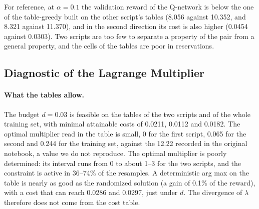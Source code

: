 For reference, at $\alpha=0.1$ the validation reward of the Q-network is below the one of the table-greedy built on the other script's tables (8.056 against 10.352, and 8.321 against 11.370), and in the second direction its cost is also higher (0.0454 against 0.0303).%
Two scripts are too few to separate a property of the pair from a general property, and the cells of the tables are poor in reservations.%

\subsection{Diagnostic of the Lagrange Multiplier}
\label{sec:lambda_diag}

\paragraph{What the tables allow.}
The budget $d=0.03$ is feasible on the tables of the two scripts and of the whole training set, with minimal attainable costs of 0.0211, 0.0112 and 0.0182.%
The optimal multiplier read in the table is small, 0 for the first script, 0.065 for the second and 0.244 for the training set, against the 12.22 recorded in the original notebook, a value we do not reproduce.%
The optimal multiplier is poorly determined: its interval runs from 0 to about 1--3 for the two scripts, and the constraint is active in 36--74\% of the resamples.%
A deterministic arg max on the table is nearly as good as the randomized solution (a gain of 0.1\% of the reward), with a cost that can reach 0.0286 and 0.0297, just under $d$.%
The divergence of $\lambda$ therefore does not come from the cost table.%

